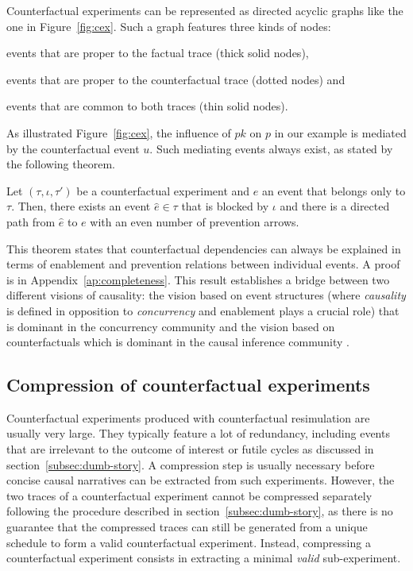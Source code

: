 Counterfactual experiments can be represented as directed acyclic
graphs like the one in Figure~\ref{fig:cex}. Such a graph features
three kinds of nodes:
\begin{inparaenum}[]
\item events that are proper to the factual trace (thick solid nodes),
\item events that are proper to the counterfactual trace (dotted
  nodes) and
\item events that are common to both traces (thin solid nodes).
\end{inparaenum}

As illustrated Figure~\ref{fig:cex}, the influence of $pk$ on $p$ in
our example is mediated by the counterfactual event $u$. Such
mediating events always exist, as stated by the following theorem.

\begin{theorem}
  \label{thm:completeness}
  Let $(\tau, \iota, \tau')$ be a counterfactual experiment and $e$ an
  event that belongs only to $\tau$. Then, there exists an event
  $\hat e \in \tau$ that is blocked by $\iota$ and there is a directed
  path from $\hat e$ to $e$ with an even number of prevention arrows.
\end{theorem}
\noindent This theorem states that counterfactual dependencies can
always be explained in terms of enablement and prevention relations
between individual events. A proof is in
Appendix~\ref{ap:completeness}. This result establishes a bridge
between two different visions of causality: the vision based on event
structures \cite{winskel1986event} (where \textit{causality} is
defined in opposition to \textit{concurrency} and enablement plays a
crucial role) that is dominant in the concurrency community and the
vision based on counterfactuals which is dominant in the causal
inference community \cite{pearl2009causality}.

\subsection{Compression of counterfactual experiments}

Counterfactual experiments produced with counterfactual resimulation
are usually very large. They typically feature a lot of redundancy,
including events that are irrelevant to the outcome of interest or
futile cycles as discussed in section~\ref{subsec:dumb-story}. A
compression step is usually necessary before concise causal narratives
can be extracted from such experiments. However, the two traces of a
counterfactual experiment cannot be compressed separately following
the procedure described in section~\ref{subsec:dumb-story}, as there
is no guarantee that the compressed traces can still be generated from
a unique schedule to form a valid counterfactual experiment. Instead,
compressing a counterfactual experiment consists in extracting a
minimal \emph{valid} sub-experiment.

